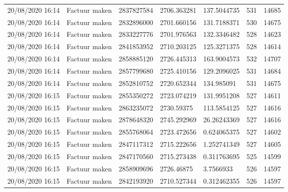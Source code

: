 \begin{tiny}
\begin{longtable}{lllllll}
    20/08/2020 16:14 & Factuur maken         & 2837827584        & 2706.363281 & 137.5044735           & 531              & 14685            \\
    20/08/2020 16:14 & Factuur maken         & 2832896000        & 2701.660156 & 131.7188371           & 530              & 14675            \\
    20/08/2020 16:14 & Factuur maken         & 2833227776        & 2701.976563 & 132.3346482           & 528              & 14623            \\
    20/08/2020 16:14 & Factuur maken         & 2841853952        & 2710.203125 & 125.3271375           & 528              & 14614            \\
    20/08/2020 16:14 & Factuur maken         & 2858885120        & 2726.445313 & 163.9004573           & 532              & 14707            \\
    20/08/2020 16:14 & Factuur maken         & 2857799680        & 2725.410156 & 129.2096025           & 531              & 14684            \\
    20/08/2020 16:14 & Factuur maken         & 2852810752        & 2720.652344 & 134.985091            & 531              & 14675            \\
    20/08/2020 16:15 & Factuur maken         & 2855350272        & 2723.074219 & 131.9951208           & 527              & 14611            \\
    20/08/2020 16:15 & Factuur maken         & 2863235072        & 2730.59375  & 113.5854125           & 527              & 14616            \\
    20/08/2020 16:15 & Factuur maken         & 2878648320        & 2745.292969 & 26.26243369           & 527              & 14616            \\
    20/08/2020 16:15 & Factuur maken         & 2855768064        & 2723.472656 & 0.624065375           & 527              & 14602            \\
    20/08/2020 16:15 & Factuur maken         & 2847117312        & 2715.222656 & 1.252741349           & 527              & 14605            \\
    20/08/2020 16:15 & Factuur maken         & 2847170560        & 2715.273438 & 0.311763695           & 525              & 14599            \\
    20/08/2020 16:15 & Factuur maken         & 2858909696        & 2726.46875  & 3.7566933             & 526              & 14597            \\
    20/08/2020 16:15 & Factuur maken         & 2842193920        & 2710.527344 & 0.312462355           & 526              & 14597            \\

\end{longtable}
\end{tiny}
